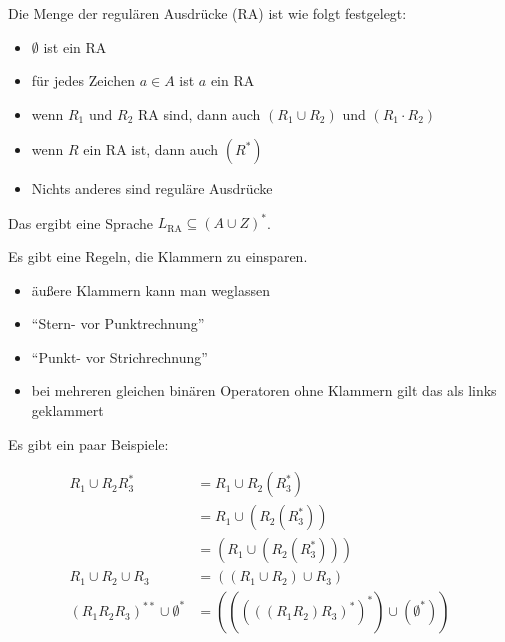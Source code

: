 \documentclass[12pt,a4paper,oneside]{article}
\newcommand{\afz}[1]{\enquote{#1}}
\newcommand{\emptyline}{\hspace*{\fill}}
\begin{document}
            \emptyline

            Die Menge der regulären Ausdrücke (RA) ist wie folgt festgelegt:

            \begin{itemize}
                \item $\emptyset$ ist ein RA
                \item für jedes Zeichen $a \in A$ ist $a$ ein RA
                \item wenn $R_1$ und $R_2$ RA sind, dann auch $(R_1 \cup R_2)$ und $(R_1 \cdot R_2)$
                \item wenn $R$ ein RA ist, dann auch $(R^*)$
                \item Nichts anderes sind reguläre Ausdrücke
            \end{itemize}

            Das ergibt eine Sprache $L_\text{RA} \subseteq (A \cup Z)^*$.

            \emptyline

            Es gibt eine Regeln, die Klammern zu einsparen.

            \begin{itemize}
                \item äußere Klammern kann man weglassen
                \item \afz{Stern- vor Punktrechnung}
                \item \afz{Punkt- vor Strichrechnung}
                \item bei mehreren gleichen binären Operatoren ohne Klammern gilt das als links geklammert
            \end{itemize}

            Es gibt ein paar Beispiele:

            \vspace{-1em}
            \begin{align*}
                                 R_1 \cup R_2 R_3^* &= R_1 \cup R_2 (R_3^*) \\
                                                    &= R_1 \cup (R_2 (R_3^*)) \\
                                                    &= (R_1 \cup (R_2 (R_3^*))) \\
                              R_1 \cup R_2 \cup R_3 &= ((R_1 \cup R_2) \cup R_3) \\ 
                (R_1 R_2 R_3)^{**} \cup \emptyset^* &= (((((R_1 R_2)R_3)^*)^*) \cup (\emptyset^*))
            \end{align*}
\end{document}
